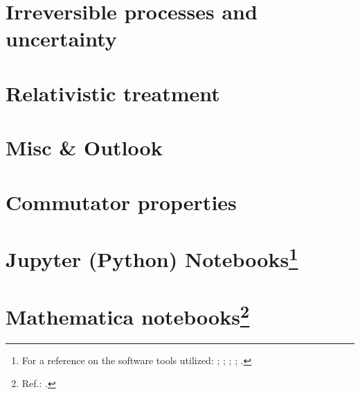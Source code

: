 \chapter{Irreversible processes and uncertainty}





\fi

\chapter{Relativistic treatment}


\fi

\chapter{Misc \& Outlook}

\fi

\appendix

\chapter{Commutator properties}


\chapter[Jupyter (Python) Notebooks]{Jupyter (Python) Notebooks\footnote{
  For a reference on the software tools utilized:
  \cite{comp:scipy};
  \cite{comp:sympy};
  \cite{comp:jupyter};
  \cite{comp:matplotlib};
  \cite{comp:numpy}.
}}





\chapter[Mathematica notebooks]{Mathematica notebooks\footnote{
  Ref.: \cite{Wolfram}.
}}



\printbibliography[heading=bibintoc]


